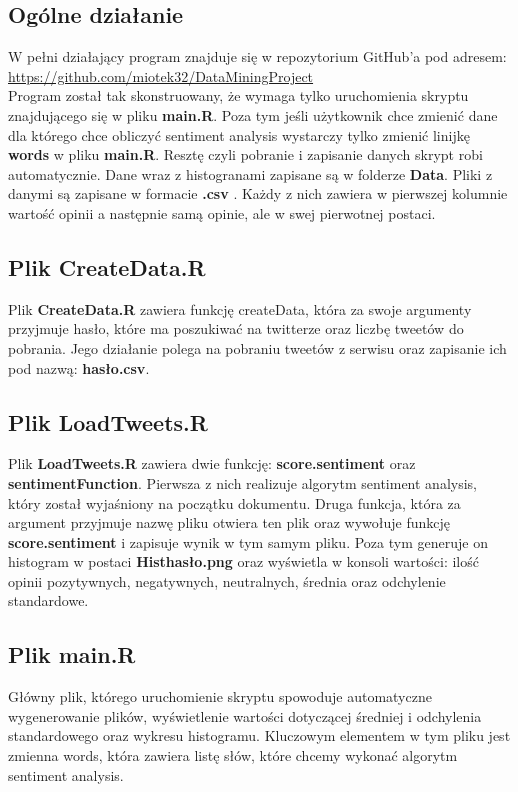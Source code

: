 \documentclass[12pt,a4paper]{article}
\begin{document}
\subsection[Ogólne działanie] {Ogólne działanie}
W pełni działający program znajduje się w repozytorium GitHub'a pod adresem: \url{https://github.com/miotek32/DataMiningProject} \\
Program został tak skonstruowany, że wymaga tylko uruchomienia skryptu znajdującego się w pliku \textbf{main.R}. Poza tym jeśli użytkownik chce zmienić dane dla którego chce obliczyć sentiment analysis wystarczy tylko zmienić linijkę \textbf{words} w pliku \textbf{main.R}. Resztę czyli pobranie i zapisanie danych skrypt robi automatycznie. Dane wraz z histogranami zapisane są w folderze \textbf{Data}. Pliki z danymi są zapisane w formacie \textbf{.csv} . Każdy z nich zawiera w pierwszej kolumnie wartość opinii a następnie samą opinie, ale w swej pierwotnej postaci.
\subsection[Plik CreateData.R]{Plik CreateData.R}
Plik \textbf{CreateData.R} zawiera funkcję createData, która za swoje argumenty przyjmuje hasło, które ma poszukiwać na twitterze oraz liczbę tweetów do pobrania. Jego działanie polega na pobraniu tweetów z serwisu oraz zapisanie ich pod nazwą: \textbf{hasło.csv}.

\subsection[Plik LoadTweets.R]{Plik LoadTweets.R}
Plik \textbf{LoadTweets.R} zawiera dwie funkcję: \textbf{score.sentiment} oraz \textbf{sentimentFunction}. Pierwsza z nich realizuje algorytm sentiment analysis, który został wyjaśniony na początku dokumentu. Druga funkcja, która za argument przyjmuje nazwę pliku otwiera ten plik oraz wywołuje funkcję \textbf{score.sentiment} i zapisuje wynik w tym samym pliku. Poza tym generuje on histogram w postaci \textbf{Histhasło.png} oraz wyświetla w konsoli wartości: ilość opinii pozytywnych, negatywnych, neutralnych, średnia oraz odchylenie standardowe.

\subsection[Plik main.R]{Plik main.R}
Główny plik, którego uruchomienie skryptu spowoduje automatyczne wygenerowanie plików, wyświetlenie wartości dotyczącej średniej i odchylenia standardowego oraz wykresu histogramu. Kluczowym elementem w tym pliku jest zmienna words, która zawiera listę słów, które chcemy wykonać algorytm sentiment analysis. 
\end{document}
